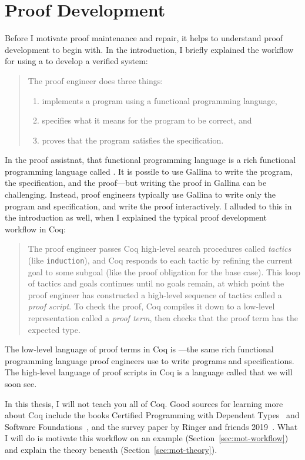 \section{Proof Development}
\label{sec:mot-dev}

Before I motivate proof maintenance and repair, it helps to understand proof development to begin with.
In the introduction, I briefly explained the workflow for using a  to develop a verified system:

\begin{quote}
The proof engineer does three things:

\begin{enumerate}
\item implements a program using a functional programming language,
\item specifies what it means for the program to be correct, and
\item proves that the program satisfies the specification.
\end{enumerate}
\end{quote}
In the  proof assistnat, that functional programming language is a rich functional programming language called .
It is possile to use Gallina to write the program, the specification, and the proof---but writing the proof in Gallina can be challenging.
Instead, proof engineers typically use Gallina to write only the program and specification,
and write the proof interactively.
I alluded to this in the introduction as well, when I explained the typical proof development workflow in Coq:

\begin{quote}
The proof engineer passes Coq high-level search procedures called \textit{tactics} (like \lstinline{induction}), and Coq responds to each tactic
by refining the current goal to some subgoal (like the proof obligation for the base case). This loop of tactics and goals 
continues until no goals remain, at which point the proof engineer has constructed a high-level sequence of tactics called a \textit{proof script}.
To check the proof, Coq compiles it down to a low-level representation called a \textit{proof term},
then checks that the proof term has the expected type.
\end{quote}
The low-level language of proof terms in Coq is ---the same rich functional programming language proof engineers use to write programs and specifications.
The high-level language of proof scripts in Coq is a language called  that we will soon see.

In this thesis, I will not teach you all of Coq.
Good sources for learning more about Coq include the books Certified Programming with Dependent Types~\cite{chlipala:cpdt}
and Software Foundations~\cite{software-foundations}, and the survey paper by Ringer and friends 2019~\cite{PGL-045}.
What I will do is motivate this workflow on an example (Section~\ref{sec:mot-workflow})
and explain the theory beneath (Section~\ref{sec:mot-theory}).





